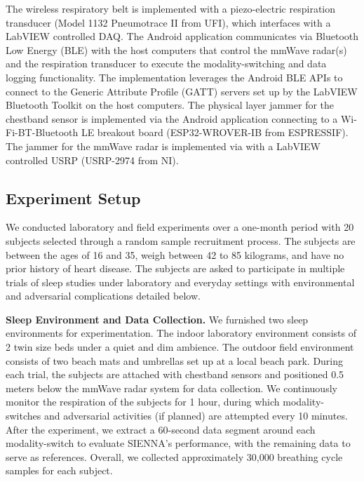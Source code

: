 
The wireless respiratory belt is implemented with a piezo-electric respiration transducer (Model 1132 Pneumotrace II from UFI), which interfaces with a LabVIEW controlled DAQ. The Android application communicates via Bluetooth Low Energy (BLE) with the host computers that control the mmWave radar(s) and the respiration transducer to execute the modality-switching and data logging functionality. The implementation leverages the Android BLE APIs to connect to the Generic Attribute Profile (GATT) servers set up by the LabVIEW Bluetooth Toolkit on the host computers. The physical layer jammer for the chestband sensor is implemented via the Android application connecting to a Wi-Fi-BT-Bluetooth LE breakout board (ESP32-WROVER-IB from ESPRESSIF). The jammer for the mmWave radar is implemented via with a LabVIEW controlled USRP (USRP-2974 from NI).

\subsection{Experiment Setup}
We conducted laboratory and field experiments over a one-month period with 20 subjects selected through a random sample recruitment process. The subjects are between the ages of 16 and 35, weigh between 42 to 85 kilograms, and have no prior history of heart disease. The subjects are asked to participate in multiple trials of sleep studies under laboratory and everyday settings with environmental and adversarial complications detailed below.

\textbf{Sleep Environment and Data Collection.} We furnished two sleep environments for experimentation. The indoor laboratory environment consists of 2 twin size beds under a quiet and dim ambience. The outdoor field environment consists of two beach mats and umbrellas set up at a local beach park. During each trial, the subjects are attached with chestband sensors and positioned 0.5 meters below the mmWave radar system for data collection. We continuously monitor the respiration of the subjects for 1 hour, during which modality-switches and adversarial activities (if planned) are attempted every 10 minutes. After the experiment, we extract a 60-second data segment around each modality-switch to evaluate SIENNA's performance, with the remaining data to serve as references. Overall, we collected approximately 30,000 breathing cycle samples for each subject.

